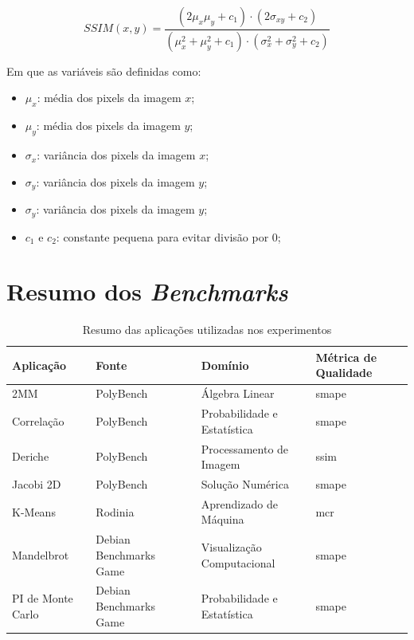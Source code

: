 \begin{equation}
	SSIM(x, y) = \frac{(2 \mu_x \mu_y + c_1) \cdot (2 \sigma_{xy} + c_2)}{(\mu_x^2 + \mu_y^2 + c_1) \cdot (\sigma_x^2 + \sigma_y^2 + c_2)}
	\label{eq:ssim}
\end{equation}

Em que as variáveis são definidas como:
\begin{itemize}
	\item $\mu_x$: média dos pixels da imagem $x$;
	\item $\mu_y$: média dos pixels da imagem $y$;
	\item $\sigma_x$: variância dos pixels da imagem $x$;
	\item $\sigma_y$: variância dos pixels da imagem $y$;
	\item $\sigma_y$: variância dos pixels da imagem $y$;
	\item $c_1$ e $c_2$: constante pequena para evitar divisão por $0$;
\end{itemize}

\section{Resumo dos \textit{Benchmarks}}\label{sec:resumo_exp}

\begin{table}[H]
	\centering
	\caption{Resumo das aplicações utilizadas nos experimentos}
	\begin{tabular}{|l|p{3.5cm}|l|l|}
		\hline
		\textbf{Aplicação} & \textbf{Fonte}                                     & \textbf{Domínio}            & \textbf{Métrica de Qualidade} \\
		\hline
		2MM                & PolyBench~\cite{polybench}                         & Álgebra Linear              & \gls{smape}                   \\
		\hline
		Correlação         & PolyBench~\cite{polybench}                         & Probabilidade e Estatística & \gls{smape}                   \\
		\hline
		Deriche            & PolyBench~\cite{polybench}                         & Processamento de Imagem     & \gls{ssim}                    \\
		\hline
		Jacobi 2D          & PolyBench~\cite{polybench}                         & Solução Numérica            & \gls{smape}                   \\
		\hline
		K-Means            & Rodinia~\cite{rodinia}                             & Aprendizado de Máquina      & \gls{mcr}                     \\
		\hline
		Mandelbrot         & Debian Benchmarks Game~\cite{debianBenchmarksGame} & Visualização Computacional  & \gls{smape}                   \\
		\hline
		PI de Monte Carlo  & Debian Benchmarks Game~\cite{debianBenchmarksGame} & Probabilidade e Estatística & \gls{smape}                   \\
		\hline
	\end{tabular}
	\fonte{}
	\label{tab:benchmarks}
\end{table}

